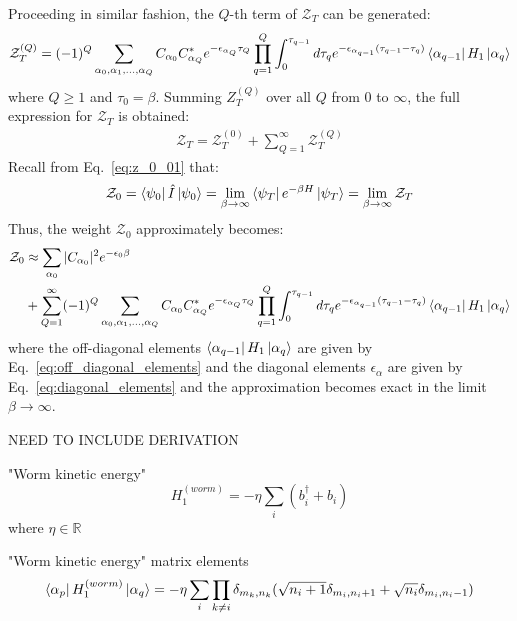\documentclass[12pt, two sided]{article}
\begin{document}
Proceeding in similar fashion, the $Q$-th term of $\mathcal{Z}_T$ can be generated:
\begin{equation}
\label{eq:Z^q}
\mathcal{Z}_T^{(Q)} = (-1)^{Q}  \sum_{\alpha_0,\alpha_1,\dots,\alpha_Q} C_{\alpha_0} C_{\alpha_Q}^* e^{-\epsilon_{\alpha_Q} \tau_Q} \prod_{q=1}^Q \int_0^{\tau_{q-1}} d\tau_q e^{-\epsilon_{\alpha_{q-1}}(\tau_{q-1}-\tau_q)} 
\bra{\alpha_{q-1}} H_1 \ket{\alpha_q}
\end{equation}
where $Q \geq 1$ and $\tau_0 = \beta$. Summing $Z_T^{(Q)}$ over all $Q$ from $0$ to $\infty$, the full expression for $\mathcal{Z}_T$ is obtained:
%
\begin{equation}
\begin{aligned}
\mathcal{Z}_T = \mathcal{Z}_T^{(0)} + \sum_{Q=1}^{\infty} \mathcal{Z}_T^{(Q)}
\end{aligned}
\end{equation}
%
Recall from Eq.~\eqref{eq:z_0_01} that:
%
\begin{equation}
\mathcal{Z}_0 = \bra{\psi_0} \hat{I} \ket{\psi_0} = \lim_{\beta\to\infty} \bra{\psi_T} e^{-\beta H} \ket{\psi_T} = \lim_{\beta\to\infty} \mathcal{Z}_T
\end{equation}
%
Thus, the weight $\mathcal{Z}_0$ approximately becomes:
\begin{equation}
\begin{aligned}
\label{eq:Z_0}
\mathcal{Z}_0 &\approx \sum_{\alpha_0} \vert C_{\alpha_0} \vert^2 e^{-\epsilon_{0} \beta} \\ &+ 
\sum_{Q=1}^{\infty} (-1)^{Q}  \sum_{\alpha_0,\alpha_1,\dots,\alpha_Q} C_{\alpha_0} C_{\alpha_Q}^* e^{-\epsilon_{\alpha_Q} \tau_Q} \prod_{q=1}^Q \int_0^{\tau_{q-1}} d\tau_q e^{-\epsilon_{\alpha_{q-1}}(\tau_{q-1}-\tau_q)} 
\bra{\alpha_{q-1}} H_1 \ket{\alpha_q}
\end{aligned}
\end{equation}
where the off-diagonal elements $\bra{\alpha_{q-1}} H_1 \ket{\alpha_q}$ are given by Eq.~\eqref{eq:off_diagonal_elements} and the diagonal elements $\epsilon_{\alpha}$ are given by Eq.~\eqref{eq:diagonal_elements} and the approximation becomes exact in the limit $\beta\to\infty$.

NEED TO INCLUDE DERIVATION 


"Worm kinetic energy"
%
\begin{equation}
H_1^{(worm)} = - \eta \sum_i (b_i^\dag + b_i)
\end{equation}
%
where $\eta \in \mathbb{R}$

"Worm kinetic energy" matrix elements
%
\begin{equation}
\bra{\alpha_p} H_1^{(worm)} \ket{\alpha_q} =  -\eta \sum_i  \prod_{k\neq i} \delta_{m_k,n_k} (\sqrt{n_i + 1} \delta_{m_i,n_{i}+1}  + \sqrt{n_i} \delta_{m_i,n_{i}-1})
\end{equation}
%
\end{document}
